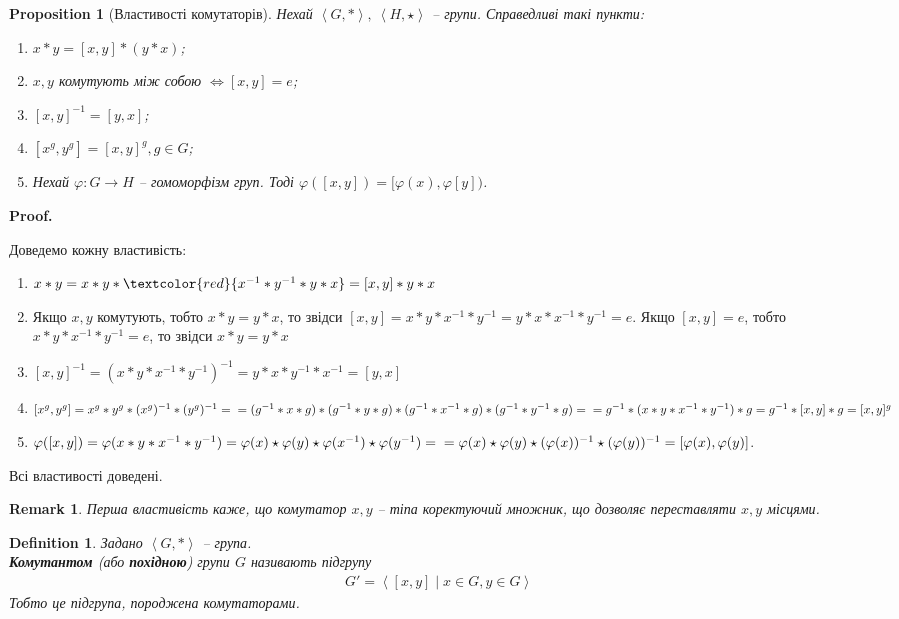 \documentclass[a4paper, 10pt]{article}
\makeatletter
\theoremstyle{theoremdd}
\theoremstyle{theoremdd}
\newtheorem{definition}[theorem]{Definition}
\theoremstyle{theoremdd}
\theoremstyle{theoremdd}
\theoremstyle{theoremdd}
\theoremstyle{theoremdd}
\theoremstyle{theoremdd}
\theoremstyle{theoremdd}
\theoremstyle{theoremdd}
\newtheorem{proposition}[theorem]{Proposition}
\theoremstyle{theoremdd}
\theoremstyle{theoremdd}
\newtheorem{remark}[theorem]{Remark}
\theoremstyle{theoremdd}
\theoremstyle{theoremdd}
\theoremstyle{theoremdd}
\theoremstyle{theoremdd}
\renewenvironment{proof}[1][Proof.\\]{\par
\pushQED{\hfill \qed}%
\normalfont \topsep6\p@\@plus6\p@\relax
\trivlist
\item\relax
{\bfseries
#1\@addpunct{.}}\hspace\labelsep\ignorespaces
}{%
\popQED\endtrivlist\@endpefalse
}
\makeatother
\begin{document}
\begin{proposition}[Властивості комутаторів]
Нехай $\left< G,* \right>,\ \left< H,\star\right>$ -- групи. Справедливі такі пункти:
\begin{enumerate}[nosep,wide=0pt,label={\arabic*)}]
\item $x*y = [x,y]*(y*x)$;
\item $x,y$ комутують між собою $\iff [x,y] = e$;
\item $[x,y]^{-1} = [y,x]$;
\item $[x^g,y^g] = [x,y]^g, g \in G$;
\item Нехай $\varphi \colon G \to H$ -- гомоморфізм груп. Тоді $\varphi([x,y]) = [\varphi(x),\varphi[y])$.
\end{enumerate}
\end{proposition}

\begin{proof}
Доведемо кожну властивість:
\begin{enumerate}[wide=0pt,label={\arabic*)}]
\item $x*y = x*y*\textcolor{red}{x^{-1}*y^{-1}*y*x} = [x,y]*y*x$
\item Якщо $x,y$ комутують, тобто $x*y=y*x$, то звідси $[x,y] = x*y*x^{-1}*y^{-1} = y*x*x^{-1}*y^{-1} = e$. Якщо $[x,y] = e$, тобто $x*y*x^{-1}*y^{-1} = e$, то звідси $x*y = y*x$
\item $[x,y]^{-1} = (x*y*x^{-1}*y^{-1})^{-1} = y*x*y^{-1}*x^{-1} = [y,x]$
\item $[x^g,y^g] = x^g*y^g*(x^g)^{-1}*(y^g)^{-1} = \\ = (g^{-1}*x*g)*(g^{-1}*y*g)*(g^{-1}*x^{-1}*g)*(g^{-1}*y^{-1}*g) = \\
= g^{-1}*(x*y*x^{-1}*y^{-1})*g = g^{-1}*[x,y]*g = [x,y]^g$
\item $\varphi([x,y]) = \varphi(x*y*x^{-1}*y^{-1}) = \varphi(x) \star \varphi(y) \star \varphi(x^{-1}) \star \varphi(y^{-1}) = \\ = \varphi(x) \star \varphi(y) \star (\varphi(x))^{-1} \star (\varphi(y))^{-1} = [\varphi(x),\varphi(y)]$.
\end{enumerate}
Всі властивості доведені.
\end{proof}

\begin{remark}
Перша властивість каже, що комутатор $x,y$ -- тіпа коректуючий множник, що дозволяє переставляти $x,y$ місцями.
\end{remark}

\begin{definition}
Задано $\left<G,*\right>$ -- група.\\
\textbf{Комутантом} (або \textbf{похідною}) групи $G$ називають підгрупу
\begin{align*}
G' = \left< [x,y] \mid x \in G, y \in G \right>
\end{align*}
Тобто це підгрупа, породжена комутаторами.
\end{definition}
\end{document}
